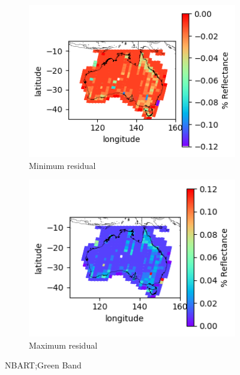 \documentclass[a4paper]{article}
\begin{document}
      \begin{figure}[h!]
        \centering
          \begin{subfigure}[l]{.4\linewidth}
            \hspace{-32mm}
            \includegraphics[scale=0.9]{plots/nbart/nbart_green-MinResidual.png}
            \caption{Minimum residual}
          \end{subfigure}
%
          \begin{subfigure}[r]{.4\linewidth}
            \includegraphics[scale=0.9]{plots/nbart/nbart_green-MaxResidual.png}
            \caption{Maximum residual}
          \end{subfigure}
        \caption{NBART;\@ Green Band}\label{figure:5}
      \end{figure}
\end{document}
